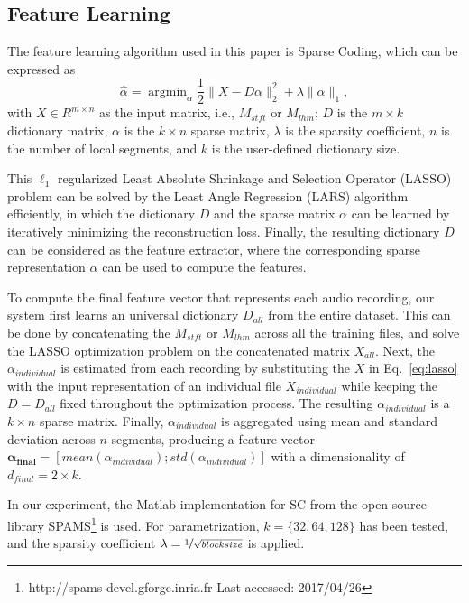 \documentclass{article}
\begin{document}
\subsection{Feature Learning}\label{subsec:feat_learn}
The feature learning algorithm used in this paper is Sparse Coding, which can be expressed as %
\begin{equation}\label{eq:lasso}
\hat{\alpha} = \mathop{\mathrm{argmin}}_\alpha \frac{1}{2} \| X - D\alpha \|_{2}^{2} + \lambda \| \alpha \|_{1}, 
\end{equation}
%
with $X \in R^{ m \times n}$ as the input matrix, i.e., $M_{stft}$ or $M_{lhm}$; $D$ is the $m \times k$ dictionary matrix, $\alpha$ is the $k \times n$ sparse matrix, $\lambda$ is the sparsity coefficient, $n$ is the number of local segments, and $k$ is the user-defined dictionary size. 

This $\ell_1$ regularized Least Absolute Shrinkage and Selection Operator (LASSO) problem can be solved by the Least Angle Regression (LARS) algorithm efficiently\cite{Efron2004}, in which the dictionary $D$ and the sparse matrix $\alpha$ can be learned by iteratively minimizing the reconstruction loss. Finally, the resulting dictionary $D$ can be considered as the feature extractor, where the corresponding sparse representation $\alpha$ can be used to compute the features. 

To compute the final feature vector that represents each audio recording, our system first learns an universal dictionary $D_{all}$ from the entire dataset. This can be done by concatenating the $M_{stft}$ or $M_{lhm}$ across all the training files, and solve the LASSO optimization problem on the concatenated matrix $X_{all}$. Next, the $\alpha_{individual}$ is estimated from each recording by substituting the $X$ in Eq.~\ref{eq:lasso} with the input representation of an individual file $X_{individual}$ while keeping the $D = D_{all}$ fixed throughout the optimization process. The resulting $\alpha_{individual}$ is a $k \times n$ sparse matrix. Finally, $\alpha_{individual}$ is aggregated using mean and standard deviation across $n$ segments, producing a feature vector $\mathbf{\alpha_{final}} = [mean(\alpha_{individual}); std(\alpha_{individual})]$ with a dimensionality of $d_{final} = 2 \times k$.  

In our experiment, the Matlab implementation for SC from the open source library SPAMS\footnote{http://spams-devel.gforge.inria.fr Last accessed: 2017/04/26}\cite{Mairal2009a} is used. For parametrization, $k = \{32, 64, 128\}$ has been tested, and the sparsity coefficient $\lambda = \nicefrac{1}{\sqrt{block size}}$ is applied. 
\end{document}
